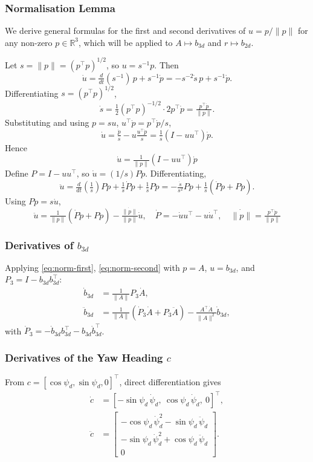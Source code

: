 \documentclass[11pt]{article}
\theoremstyle{remark}
\newcommand{\R}{\mathbb{R}}
\begin{document}
\subsubsection{Normalisation Lemma}
We derive general formulas for the first and second derivatives of $u = p/\|p\|$ for any non-zero $p \in \R^3$, which will be applied to $A \mapsto b_{3d}$ and $r \mapsto b_{2d}$.

Let $s = \|p\| = (p^\top p)^{1/2}$, so $u = s^{-1}p$. Then
\[
\dot u = \tfrac{d}{dt}(s^{-1})\,p + s^{-1}\dot p = -s^{-2}\dot s\,p + s^{-1}\dot p.
\]
Differentiating $s = (p^\top p)^{1/2}$,
\[
\dot s = \tfrac{1}{2}(p^\top p)^{-1/2}\cdot 2 p^\top\dot p = \tfrac{p^\top\dot p}{\|p\|}.
\]
Substituting and using $p = su$, $u^\top\dot p = p^\top\dot p/s$,
\[
\dot u = \tfrac{\dot p}{s} - u\tfrac{u^\top\dot p}{s} = \tfrac{1}{s}(I - uu^\top)\dot p.
\]
Hence
\begin{equation}
\boxed{\quad\dot u = \tfrac{1}{\|p\|}(I - uu^\top)\dot p\quad}
\label{eq:norm-first}
\end{equation}
Define $P = I - uu^\top$, so $\dot u = (1/s)P\dot p$. Differentiating,
\[
\ddot u = \tfrac{d}{dt}\!\left(\tfrac{1}{s}\right)P\dot p + \tfrac{1}{s}\dot P\dot p + \tfrac{1}{s}P\ddot p = -\tfrac{\dot s}{s^2}P\dot p + \tfrac{1}{s}(\dot P\dot p + P\ddot p).
\]
Using $P\dot p = s\dot u$,
\begin{equation}
\boxed{\quad \ddot u = \tfrac{1}{\|p\|}(\dot P\dot p + P\ddot p) - \tfrac{\dot{\|p\|}}{\|p\|}\dot u,\quad \dot P = -\dot u u^\top - u\dot u^\top,\quad \dot{\|p\|} = \tfrac{p^\top\dot p}{\|p\|}\quad}
\label{eq:norm-second}
\end{equation}

\subsubsection{Derivatives of $b_{3d}$}
Applying \eqref{eq:norm-first}, \eqref{eq:norm-second} with $p = A$, $u = b_{3d}$, and $P_3 = I - b_{3d}b_{3d}^\top$:
\begin{align}
\dot b_{3d} &= \tfrac{1}{\|A\|}P_3\dot A,\label{eq:b3d-dot}\\
\ddot b_{3d} &= \tfrac{1}{\|A\|}(\dot P_3\dot A + P_3\ddot A) - \tfrac{A^\top\dot A}{\|A\|^2}\dot b_{3d},\label{eq:b3d-ddot}
\end{align}
with $\dot P_3 = -\dot b_{3d}b_{3d}^\top - b_{3d}\dot b_{3d}^\top$.

\subsubsection{Derivatives of the Yaw Heading $c$}
From $c = [\cos\psi_d,\sin\psi_d,0]^\top$, direct differentiation gives
\begin{align}
\dot c &= [-\sin\psi_d\,\dot\psi_d,\ \cos\psi_d\,\dot\psi_d,\ 0]^\top,\\
\ddot c &=
\begin{bmatrix}
-\cos\psi_d\,\dot\psi_d^2 - \sin\psi_d\,\ddot\psi_d\\
-\sin\psi_d\,\dot\psi_d^2 + \cos\psi_d\,\ddot\psi_d\\
0
\end{bmatrix}.
\end{align}
\end{document}
